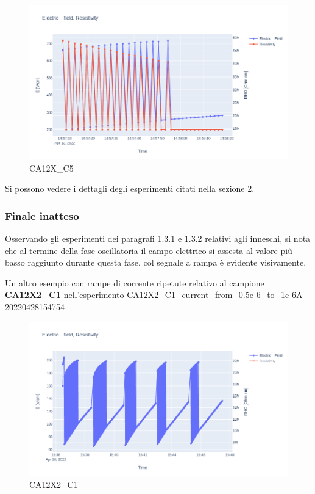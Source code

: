 \documentclass[11pt]{article}
\begin{document}
\begin{figure}
\centering
\includegraphics{CA12X_C5-3_5-5.png}
\caption{CA12X\_C5}
\end{figure}

Si possono vedere i dettagli degli esperimenti citati nella sezione 2.

    \hypertarget{finale-inatteso}{%
\subsubsection{Finale inatteso}\label{finale-inatteso}}

Osservando gli esperimenti dei paragrafi 1.3.1 e 1.3.2 relativi agli
inneschi, si nota che al termine della fase oscillatoria il campo
elettrico si assesta al valore più basso raggiunto durante questa fase,
col segnale a rampa è evidente visivamente.

Un altro esempio con rampe di corrente ripetute relativo al campione
\textbf{CA12X2\_C1} nell'esperimento
CA12X2\_C1\_current\_from\_0.5e-6\_to\_1e-6A-20220428154754

\begin{figure}
\centering
\includegraphics{CA12X2_C1-e.png}
\caption{CA12X2\_C1}
\end{figure}
\end{document}
